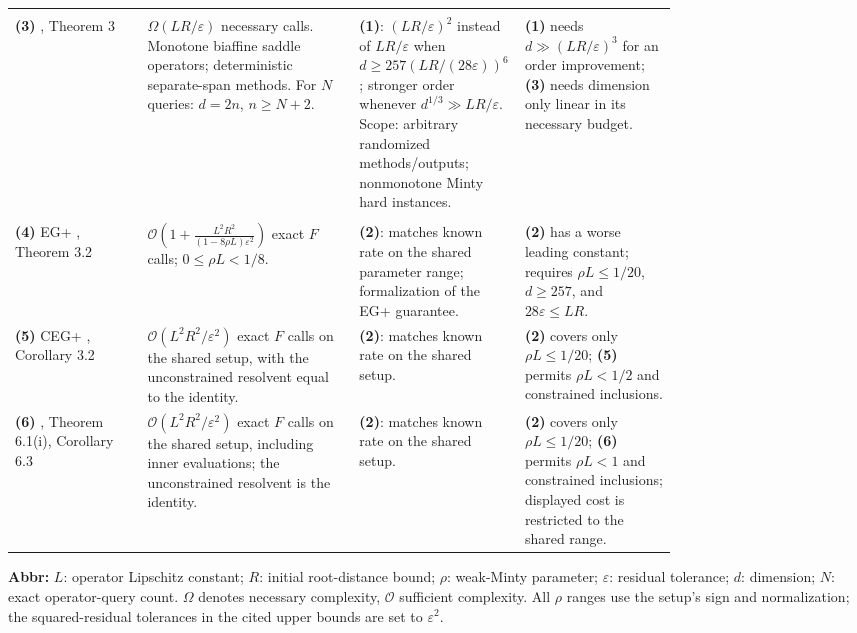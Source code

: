 \begin{table}[tp]
\begin{threeparttable}
\begin{tabularx}{\linewidth}{@{}>{\raggedright\arraybackslash}p{0.20\linewidth}>{\raggedright\arraybackslash}p{0.32\linewidth}>{\raggedright\arraybackslash}p{0.25\linewidth}>{\raggedright\arraybackslash}X@{}}
\midrule[1.2pt]
\multicolumn{4}{@{}l}{\textbf{Prior lower bound: necessary budget}} \\
\textbf{(3)} \citep{ewmYoonRyu2021Verified}, Theorem 3 & $\Omega(LR/\varepsilon)$ necessary calls. Monotone biaffine saddle operators; deterministic separate-span methods. For $N$ queries: $d=2n$, $n\ge N+2$. & \textbf{(1)}: $(LR/\varepsilon)^2$ instead of $LR/\varepsilon$ when $d\ge257(LR/(28\varepsilon))^6$; stronger order whenever $d^{1/3}\gg LR/\varepsilon$. Scope: arbitrary randomized methods/outputs; nonmonotone Minty hard instances. & \textbf{(1)} needs $d\gg(LR/\varepsilon)^3$ for an order improvement; \textbf{(3)} needs dimension only linear in its necessary budget. \\
\midrule
\multicolumn{4}{@{}l}{\textbf{Prior upper bounds: sufficient budgets}} \\
\textbf{(4)} EG+ \citep{ewmDDJ2021Verified}, Theorem 3.2 & $\mathcal{O}\!\left(1+\frac{L^2R^2}{(1-8\rho L)\varepsilon^2}\right)$ exact $F$ calls; $0\le\rho L<1/8$. & \textbf{(2)}: matches known rate on the shared parameter range; formalization of the EG+ guarantee. & \textbf{(2)} has a worse leading constant; requires $\rho L\le1/20$, $d\ge257$, and $28\varepsilon\le LR$. \\
\midrule
\textbf{(5)} CEG+ \citep{ewmPethick2023v1Verified}, Corollary 3.2 & $\mathcal{O}(L^2R^2/\varepsilon^2)$ exact $F$ calls on the shared setup, with the unconstrained resolvent equal to the identity. & \textbf{(2)}: matches known rate on the shared setup. & \textbf{(2)} covers only $\rho L\le1/20$; \textbf{(5)} permits $\rho L<1/2$ and constrained inclusions. \\
\midrule
\textbf{(6)} \citep{ewmPethick2025Verified}, Theorem 6.1(i), Corollary 6.3 & $\mathcal{O}(L^2R^2/\varepsilon^2)$ exact $F$ calls on the shared setup, including inner evaluations; the unconstrained resolvent is the identity. & \textbf{(2)}: matches known rate on the shared setup. & \textbf{(2)} covers only $\rho L\le1/20$; \textbf{(6)} permits $\rho L<1$ and constrained inclusions; displayed cost is restricted to the shared range. \\
\bottomrule
\end{tabularx}
\begin{tablenotes}[flushleft]\footnotesize
\item[] \textbf{Abbr:} $L$: operator Lipschitz constant; $R$: initial root-distance bound; $\rho$: weak-Minty parameter; $\varepsilon$: residual tolerance; $d$: dimension; $N$: exact operator-query count. $\Omega$ denotes necessary complexity, $\mathcal{O}$ sufficient complexity. All $\rho$ ranges use the setup's sign and normalization; the squared-residual tolerances in the cited upper bounds are set to $\varepsilon^2$.
\end{tablenotes}
\end{threeparttable}
\end{table}
\clearpage

